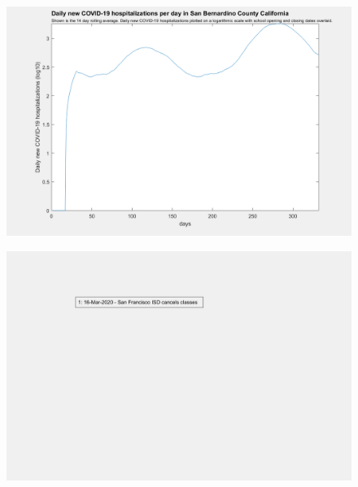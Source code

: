\documentclass[]{article}
\begin{document}
\begin{figure}[!h]
	\includegraphics[width=\linewidth]{images/san_bernardino_hospitalizations_school_log.png}
	\caption{}
	\label{fig:images/san_bernardino_hospitalizations_school_logLabel}
\end{figure}

\begin{figure}[!h]
	\includegraphics[width=\linewidth]{legends/san_francisco_school_legend.png}
	\caption{}
	\label{fig:legends/san_francisco_school_legendLabel}
\end{figure}
\end{document}

